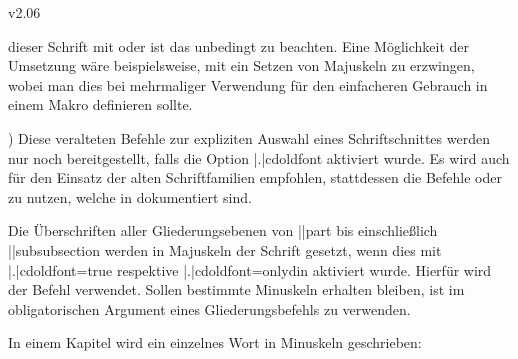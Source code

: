\begin{NoIndexDefault}
\begin{Cessations}{v2.06}
\begin{Cessation}
\begin{Cessation}
\begin{Cessation}
\begin{Cessation}
\begin{Cessation}
\begin{Cessation}
\begin{Cessation}
\begin{Cessation}
\begin{Cessation}
\begin{Cessation}
\begin{Cessation}
\begin{Cessation}
\begin{Cessation}
\begin{Cessation}
\begin{Cessation}
\begin{Cessation}
\begin{Cessation}
\begin{Cessation}
\begin{quoting}
  dieser Schrift mit  oder  ist das
  unbedingt zu beachten. Eine Möglichkeit der Umsetzung wäre beispielsweise, 
  mit  ein 
  Setzen von Majuskeln zu erzwingen, wobei man dies bei mehrmaliger Verwendung 
  für den einfacheren Gebrauch in einem Makro definieren sollte.
  \end{quoting}
)
%
Diese veralteten Befehle zur expliziten Auswahl eines Schriftschnittes werden 
nur noch bereitgestellt, falls die Option \Option|.|{cdoldfont} aktiviert 
wurde. Es wird auch für den Einsatz der alten Schriftfamilien empfohlen, 
stattdessen die Befehle  oder  zu 
nutzen, welche in  dokumentiert sind.
\end{Cessation}
\end{Cessation}
\end{Cessation}
\end{Cessation}
\end{Cessation}
\end{Cessation}
\end{Cessation}
\end{Cessation}
\end{Cessation}
\end{Cessation}
\end{Cessation}
\end{Cessation}
\end{Cessation}
\end{Cessation}
\end{Cessation}
\end{Cessation}
\end{Cessation}
\end{Cessation}



Die Überschriften aller Gliederungsebenen von \Macro||{part} bis einschließlich 
\Macro||{subsubsection} werden in Majuskeln der Schrift \DIN gesetzt, wenn dies 
mit \Option|.|{cdoldfont=true} respektive \Option|.|{cdoldfont=onlydin} 
aktiviert wurde. Hierfür wird der Befehl  verwendet. 
Sollen bestimmte Minuskeln erhalten bleiben, ist  im 
obligatorischen Argument eines Gliederungsbefehls zu verwenden.
%
\begin{Example}
In einem Kapitel wird ein einzelnes Wort in Minuskeln geschrieben:
\begin{Code}

\end{Code}
\end{Example}
\end{Cessations}
\end{NoIndexDefault}
